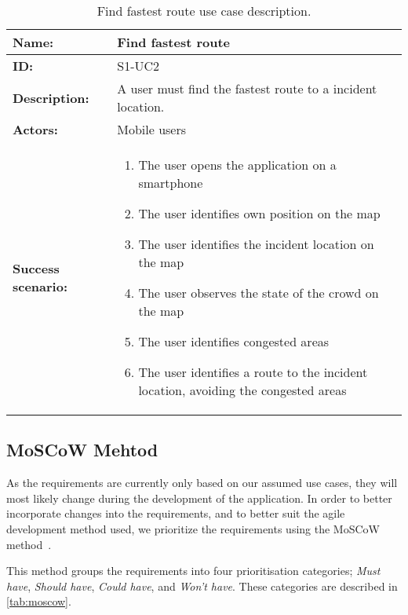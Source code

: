 \begin{table}[h!]
    \centering
    \begin{tabularx}{\textwidth}{|l|X|}
        \hline
        \textbf{Name:}  & Find fastest route \\ \hline
        \textbf{ID:}    & S1-UC2\\ \hline
        \textbf{Description:} & A user must find the fastest route to a incident location. \\ \hline
        \textbf{Actors:} & Mobile users \\ \hline
        \textbf{Success scenario:} & 
        \begin{enumerate}
            \item The user opens the application on a smartphone
            \item The user identifies own position on the map
            \item The user identifies the incident location on the map
            \item The user observes the state of the crowd on the map
            \item The user identifies congested areas
            \item The user identifies a route to the incident location, avoiding the congested areas
        \end{enumerate}
        \\
        \hline
    \end{tabularx}
    \caption{Find fastest route use case description.}
    \label{tab:s1-uc2}
\end{table}

\subsection{MoSCoW Mehtod}
As the requirements are currently only based on our assumed use cases, they will most likely change during the development of the application. In order to better incorporate changes into the requirements, and to better suit the agile development method used, we prioritize the requirements using the MoSCoW method~\cite{moscow}.

This method groups the requirements into four prioritisation categories; \emph{Must have}, \emph{Should have}, \emph{Could have}, and \emph{Won't have}. These categories are described in \cref{tab:moscow}.

